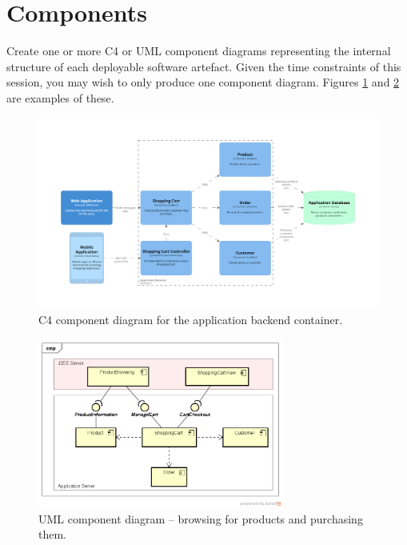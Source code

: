 \documentclass{csse4400}
\begin{document}
\newpage
\section{Components}
Create one or more C4 or UML component diagrams representing the internal structure of each deployable software artefact.
Given the time constraints of this session, you may wish to only produce one component diagram.
Figures \ref{fig:c4_component_appbackend} and \ref{fig:uml_component} are examples of these.

\begin{figure}[h!]
    \centering
    \begin{adjustwidth}{-5mm}{-5mm}
        \includegraphics[trim=190 185 197 198,clip,width=0.92\paperwidth]{../../notes/views/images/c4/appbackend_component_diagram.png}
    \end{adjustwidth}
    \caption{C4 component diagram for the application backend container.}
    \label{fig:c4_component_appbackend}
\end{figure}

\begin{figure}[h!]
    \centering
    \includegraphics[trim=40 40 23 50,clip,width=0.72\textwidth]{../../notes/views/images/uml/component_diagram.png}
    \caption{UML component diagram -- browsing for products and purchasing them.}
    \label{fig:uml_component}
\end{figure}
\end{document}
